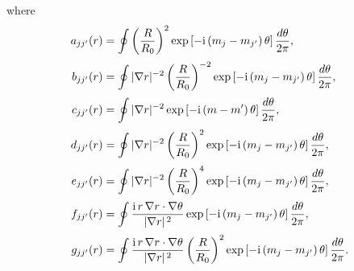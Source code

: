 \documentclass[12pt,prb,aps,notitlepage]{revtex4-1}
\begin{document}
where
\begin{align}
a_{jj'}(r) &= \oint \left(\frac{R}{R_0}\right)^2\exp\left[-{\rm i}\,(m_j-m_{j'})\,\theta\right]\frac{d\theta}{2\pi},\\[0.5ex]
b_{jj'}(r)&=\oint |\nabla r|^{-2}\left(\frac{R}{R_0}\right)^{-2}\exp\left[-{\rm i}\,(m_j-m_{j'})\,\theta\right]\frac{d\theta}{2\pi},\\[0.5ex]
c_{jj'}(r)&=\oint |\nabla r|^{-2}\exp\left[-{\rm i}\,(m-m')\,\theta\right]\frac{d\theta}{2\pi},\\[0.5ex]
d_{jj'}(r)&=\oint |\nabla r|^{-2}\left(\frac{R}{R_0}\right)^{2}\exp\left[-{\rm i}\,(m_j-m_{j'})\,\theta\right]\frac{d\theta}{2\pi},\\[0.5ex]
e_{jj'}(r)&=\oint |\nabla r|^{-2}\left(\frac{R}{R_0}\right)^{4}\exp\left[-{\rm i}\,(m_j-m_{j'})\,\theta\right]\frac{d\theta}{2\pi},\\[0.5ex]
f_{jj'}(r)&=\oint\frac{{\rm i}\,r\,\nabla r\cdot\nabla\theta}{|\nabla r|^{\,2}}\exp\left[-{\rm i}\,(m_j-m_{j'})\,\theta\right]\frac{d\theta}{2\pi},\\[0.5ex]
g_{jj'}(r)&=\oint\frac{{\rm i}\,r\,\nabla r\cdot\nabla\theta}{|\nabla r|^{\,2}}\left(\frac{R}{R_0}\right)^2\exp\left[-{\rm i}\,(m_j-m_{j'})\,\theta\right]\frac{d\theta}{2\pi}.
\end{align}
\end{document}
